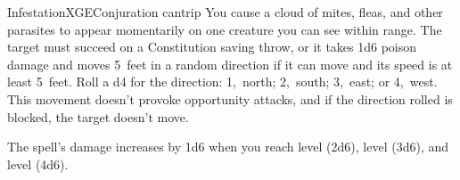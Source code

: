 \begin{spell}{Infestation}{XGE}{Conjuration cantrip}
{
}
You cause a cloud of mites, fleas, and other parasites to
appear momentarily on one creature you can see within
range. The target must succeed on a Constitution saving
throw, or it takes 1d6 poison damage and moves 5~feet
in a random direction if it can move and its speed is at
least 5~feet. Roll a d4 for the direction: 1,~north; 2,~south;
3,~east; or 4,~west. This movement doesn't provoke opportunity
attacks, and if the direction rolled is blocked,
the target doesn't move.

 The spell's damage increases by
1d6 when you reach  level (2d6),  level (3d6),
and  level (4d6).
\end{spell}
